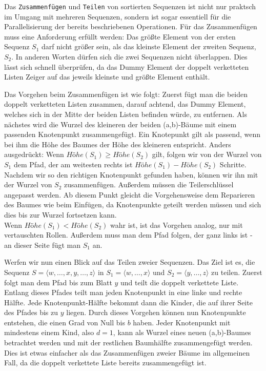 Das \texttt{Zusammenfügen} und \texttt{Teilen} von sortierten Sequenzen ist nicht nur praktsch im Umgang mit mehreren Sequenzen, sondern ist sogar essentiell für die Parallelisierung der bereits beschriebenen Operationen. Für das Zusammenfügen muss eine Anforderung erfüllt werden: Das größte Element von der ersten Sequenz $S_1$ darf nicht größer sein, als das kleinste Element der zweiten Sequenz, $S_2$. In anderen Worten dürfen sich die zwei Sequenzen nicht überlappen. Dies lässt sich schnell überprüfen, da das Dummy Element der doppelt verketteten Listen Zeiger auf das jeweils kleinste und größte Element enthält.
\par
Das Vorgehen beim Zusammenfügen ist wie folgt: Zuerst fügt man die beiden doppelt verketteten Listen zusammen, darauf achtend, das Dummy Element, welches sich in der Mitte der beiden Listen befinden würde, zu entfernen. Als nächstes wird die Wurzel des kleineren der beiden (a,b)-Bäume mit einem passenden Knotenpunkt zusammengefügt. Ein Knotepunkt gilt als passend, wenn bei ihm die Höhe des Baumes der Höhe des kleineren entspricht. Anders ausgedrückt: Wenn $Höhe(S_1) \geq Höhe(S_2)$ gilt, folgen wir von der Wurzel von $S_1$ dem Pfad, der am weitesten rechts ist $Höhe(S_1) - Höhe(S_2)$ Schritte. Nachdem wir so den richtigen Knotenpunkt gefunden haben, können wir ihn mit der Wurzel von $S_2$ zusammenfügen. Außerdem müssen die Teilerschlüssel angepasst werden. Ab diesem Punkt gleicht die Vorgehensweise dem Reparieren des Baumes wie beim Einfügen, da Knotenpunkte geteilt werden müssen und sich dies bis zur Wurzel fortsetzen kann.
\\
Wenn $Höhe(S_1) < Höhe(S_2)$ wahr ist, ist das Vorgehen analog, nur mit vertauschten Rollen. Außerdem muss man dem Pfad folgen, der ganz links ist - an dieser Seite fügt man $S_1$ an. \cite{Sanders:19}
\par
Werfen wir nun einen Blick auf das Teilen zweier Sequenzen. Das Ziel ist es, die Sequenz $S = \langle w, \dots , x,y, \dots, z \rangle$ in $S_1 = \langle w, \dots , x \rangle$ und $S_2 = \langle y, \dots , z \rangle$ zu teilen. Zuerst folgt man dem Pfad bis zum Blatt $y$ und teilt die doppelt verkettete Liste. Entlang dieses Pfades teilt man jeden Knotenpunkt in eine linke und rechte Hälfte. Jede Knotenpunkt-Hälfte bekommt dann die Kinder, die auf ihrer Seite des Pfades bis zu $y$ liegen. Durch dieses Vorgehen können nun Knotenpunkte entstehen, die einen Grad von Null bis $b$ haben. Jeder Knotenpunkt mit mindestens einem Kind, also $d = 1$, kann als Wurzel eines neuen (a,b)-Baumes betrachtet werden und mit der restlichen Baumhälfte zusammengefügt werden. Dies ist etwas einfacher als das Zusammenfügen zweier Bäume im allgemeinen Fall, da die doppelt verkettete Liste bereits zusammengefügt ist.
